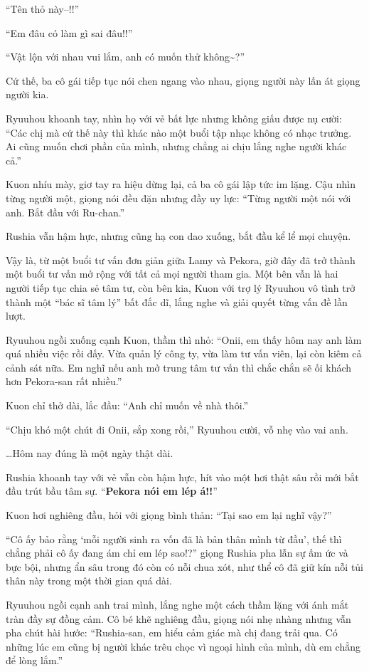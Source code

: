 \documentclass[../main.tex]{subfiles}
\begin{document}
``Tên thỏ này--!!''

``Em đâu có làm gì sai đâu!!''

``Vật lộn với nhau vui lắm, anh có muốn thử không\~{}?''

Cứ thế, ba cô gái tiếp tục nói chen ngang vào nhau, giọng người này lấn át giọng người kia.

Ryuuhou khoanh tay, nhìn họ với vẻ bất lực nhưng không giấu được nụ cười: ``Các chị mà cứ thế này thì khác nào một buổi tập nhạc không có nhạc trưởng. Ai cũng muốn chơi phần của mình, nhưng chẳng ai chịu lắng nghe người khác cả.''

Kuon nhíu mày, giơ tay ra hiệu dừng lại, cả ba cô gái lập tức im lặng. Cậu nhìn từng người một, giọng nói đều đặn nhưng đầy uy lực: ``Từng người một nói với anh. Bắt đầu với Ru-chan.''

Rushia vẫn hậm hực, nhưng cũng hạ con dao xuống, bắt đầu kể lể mọi chuyện.

Vậy là, từ một buổi tư vấn đơn giản giữa Lamy và Pekora, giờ đây đã trở thành một buổi tư vấn mở rộng với tất cả mọi người tham gia. Một bên vẫn là hai người tiếp tục chia sẻ tâm tư, còn bên kia, Kuon với trợ lý Ryuuhou vô tình trở thành một ``bác sĩ tâm lý'' bất đắc dĩ, lắng nghe và giải quyết từng vấn đề lần lượt.

Ryuuhou ngồi xuống cạnh Kuon, thầm thì nhỏ: ``Onii, em thấy hôm nay anh làm quá nhiều việc rồi đấy. Vừa quản lý công ty, vừa làm tư vấn viên, lại còn kiêm cả cảnh sát nữa. Em nghĩ nếu anh mở trung tâm tư vấn thì chắc chắn sẽ ối khách hơn Pekora-san rất nhiều.''

Kuon chỉ thở dài, lắc đầu: ``Anh chỉ muốn về nhà thôi.''

``Chịu khó một chút đi Onii, sắp xong rồi,'' Ryuuhou cười, vỗ nhẹ vào vai anh.

\dots Hôm nay đúng là một ngày thật dài.

\ct

Rushia khoanh tay với vẻ vẫn còn hậm hực, hít vào một hơi thật sâu rồi mới bắt đầu trút bầu tâm sự. ``\textbf{Pekora nói em lép á!!}''

Kuon hơi nghiêng đầu, hỏi với giọng bình thản: ``Tại sao em lại nghĩ vậy?''

``Cô ấy bảo rằng `mỗi người sinh ra vốn đã là bản thân mình từ đầu', thế thì chẳng phải cô ấy đang ám chỉ em lép sao!?'' giọng Rushia pha lẫn sự ấm ức và bực bội, nhưng ẩn sâu trong đó còn có nỗi chua xót, như thể cô đã giữ kín nỗi tủi thân này trong một thời gian quá dài.

Ryuuhou ngồi cạnh anh trai mình, lắng nghe một cách thầm lặng với ánh mắt tràn đầy sự đồng cảm. Cô bé khẽ nghiêng đầu, giọng nói nhẹ nhàng nhưng vẫn pha chút hài hước: ``Rushia-san, em hiểu cảm giác mà chị đang trải qua. Có những lúc em cũng bị người khác trêu chọc vì ngoại hình của mình, dù em chẳng để lòng lắm.''
\end{document}
